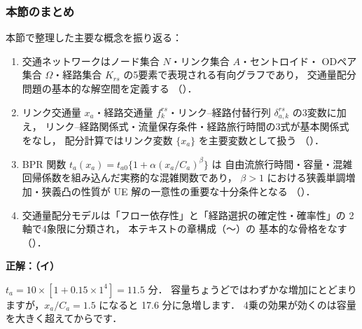 \subsubsection*{本節のまとめ}

本節で整理した主要な概念を振り返る：
\begin{enumerate}
  \item 交通ネットワークはノード集合 $N$・リンク集合 $A$・セントロイド・
        ODペア集合 $\Omega$・経路集合 $K_{rs}$ の5要素で表現される有向グラフであり，
        交通量配分問題の基本的な解空間を定義する
        （）．
  \item リンク交通量 $x_a$・経路交通量 $f_k^{rs}$・リンク–経路付替行列
        $\delta_{a,k}^{rs}$ の3変数に加え，
        リンク–経路関係式・流量保存条件・経路旅行時間の3式が基本関係式をなし，
        配分計算ではリンク変数 $\{x_a\}$ を主要変数として扱う
        （）．
  \item BPR 関数 $t_a(x_a) = t_{a0}\{1 + \alpha(x_a/C_a)^\beta\}$ は
        自由流旅行時間・容量・混雑回帰係数を組み込んだ実務的な混雑関数であり，
        $\beta > 1$ における狭義単調増加・狭義凸の性質が
        UE 解の一意性の重要な十分条件となる
        （）．
  \item 交通量配分モデルは「フロー依存性」と「経路選択の確定性・確率性」の
        2軸で4象限に分類され，
        本テキストの章構成（〜）の
        基本的な骨格をなす
        （）．
\end{enumerate}

\begin{example}[title={クイズ 1 正解・解説}]
\label{ans:q01}
\textbf{正解：（イ）}

$t_a=10\times[1+0.15\times 1^4]=11.5$ 分．
容量ちょうどではわずかな増加にとどまりますが，$x_a/C_a=1.5$ になると 17.6 分に急増します．
4乗の効果が効くのは容量を大きく超えてからです．
\end{example}
